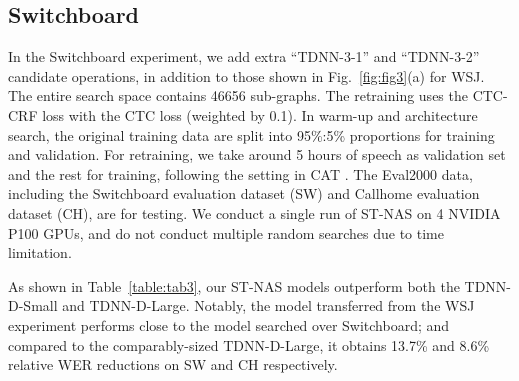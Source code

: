 \documentclass{article}
\newcommand{\figref}{Fig.~\ref}
\newcommand{\tabref}{Table~\ref}
\begin{document}
\vspace{-3mm}
\subsection{Switchboard}
\vspace{-1mm}
In the Switchboard experiment, we add extra ``TDNN-3-1'' and ``TDNN-3-2'' candidate operations, in addition to those shown in \figref{fig:fig3}(a) for WSJ. The entire search space contains 46656 sub-graphs.
The retraining uses the CTC-CRF loss with the CTC loss (weighted by 0.1). In warm-up and architecture search, the original training data are split into 95\%:5\% proportions for training and validation.
For retraining, we take around 5 hours of speech as validation set and the rest for training, following the setting in CAT \cite{an2020cat}.
The Eval2000 data, including the Switchboard evaluation dataset (SW) and Callhome evaluation dataset (CH), are for testing.
We conduct a single run of ST-NAS on 4 NVIDIA P100 GPUs, and do not conduct multiple random searches due to time limitation.

As shown in \tabref{table:tab3}, our ST-NAS models outperform both the TDNN-D-Small and TDNN-D-Large.
Notably, the model transferred from the WSJ experiment performs close to the model searched over Switchboard; and compared to the comparably-sized TDNN-D-Large, it obtains 13.7\% and 8.6\% relative WER reductions on SW and CH respectively.
\end{document}

